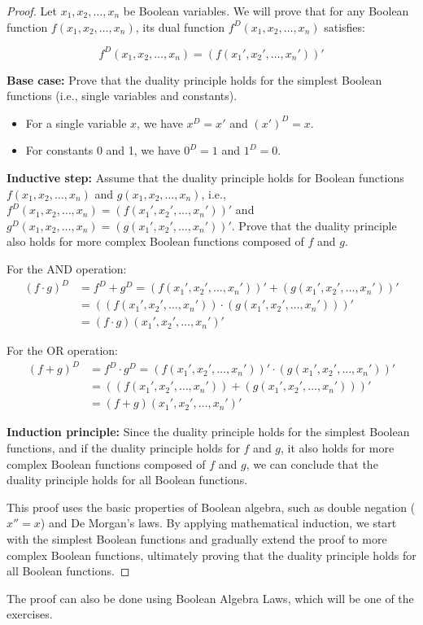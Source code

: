     \begin{proof}
        Let $x_1, x_2, \ldots, x_n$ be Boolean variables. We will prove that for any Boolean function $f(x_1, x_2, \ldots, x_n)$, its dual function $f^D(x_1, x_2, \ldots, x_n)$ satisfies:

        \[f^D(x_1, x_2, \ldots, x_n) = (f(x_1', x_2', \ldots, x_n'))'\]

        \textbf{Base case:} Prove that the duality principle holds for the simplest Boolean functions (i.e., single variables and constants).
        \begin{itemize}
            \item For a single variable $x$, we have $x^D = x'$ and $(x')^D = x$.
            \item For constants 0 and 1, we have $0^D = 1$ and $1^D = 0$.
        \end{itemize}

        \textbf{Inductive step:} Assume that the duality principle holds for Boolean functions $f(x_1, x_2, \ldots, x_n)$ and $g(x_1, x_2, \ldots, x_n)$, i.e., $f^D(x_1, x_2, \ldots, x_n) = (f(x_1', x_2', \ldots, x_n'))'$ and $g^D(x_1, x_2, \ldots, x_n) = (g(x_1', x_2', \ldots, x_n'))'$. Prove that the duality principle also holds for more complex Boolean functions composed of $f$ and $g$.

        For the AND operation:
        \begin{align*}
        (f \cdot g)^D &= f^D + g^D = (f(x_1', x_2', \ldots, x_n'))' + (g(x_1', x_2', \ldots, x_n'))' \\
        &= ((f(x_1', x_2', \ldots, x_n')) \cdot (g(x_1', x_2', \ldots, x_n')))' \\
        &= (f \cdot g)(x_1', x_2', \ldots, x_n')'
        \end{align*}

        For the OR operation:
        \begin{align*}
        (f + g)^D &= f^D \cdot g^D = (f(x_1', x_2', \ldots, x_n'))' \cdot (g(x_1', x_2', \ldots, x_n'))' \\
        &= ((f(x_1', x_2', \ldots, x_n')) + (g(x_1', x_2', \ldots, x_n')))' \\
        &= (f + g)(x_1', x_2', \ldots, x_n')'
        \end{align*}

        \textbf{Induction principle:} Since the duality principle holds for the simplest Boolean functions, and if the duality principle holds for $f$ and $g$, it also holds for more complex Boolean functions composed of $f$ and $g$, we can conclude that the duality principle holds for all Boolean functions.

        This proof uses the basic properties of Boolean algebra, such as double negation ($x'' = x$) and De Morgan's laws. By applying mathematical induction, we start with the simplest Boolean functions and gradually extend the proof to more complex Boolean functions, ultimately proving that the duality principle holds for all Boolean functions.
    \end{proof}
    The proof can also be done using Boolean Algebra Laws, which will be one of the exercises.

